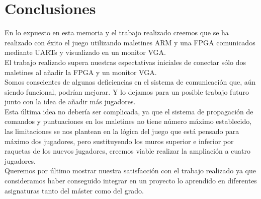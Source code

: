 \section{Conclusiones}
\label{s4:sec:Conclusiones}

En lo expuesto en esta memoria y el trabajo realizado creemos que se
ha realizado con éxito el juego \pong utilizando maletines ARM y una
FPGA comunicados mediante UARTs y visualizado en un monitor VGA. \\

El trabajo realizado supera nuestras espectativas iniciales de
conectar sólo dos maletines al añadir la FPGA y un monitor VGA. \\

Somos conscientes de algunas deficiencias en el sistema de
comunicación que, aún siendo funcional, podrían mejorar. Y lo dejamos
para un posible trabajo futuro junto con la idea de añadir más
jugadores. \\

Esta última idea no debería ser complicada, ya que el sistema de
propagación de comandos y puntuaciones en los maletines no tiene
número máximo establecido, las limitaciones se nos plantean en la
lógica del juego que está pensado para máximo dos jugadores, pero
sustituyendo los muros superior e inferior por raquetas de los nuevos
jugadores, creemos viable realizar la ampliación a cuatro jugadores. \\

Queremos por último mostrar nuestra satisfacción con el trabajo
realizado ya que consideramos haber conseguido integrar en un proyecto
lo aprendido en diferentes asignaturas tanto del máster como del
grado. 
%
%


